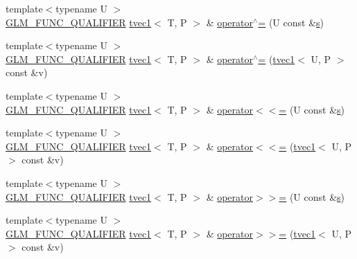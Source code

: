 \begin{DoxyCompactItemize}
\item 
{\footnotesize template$<$typename U $>$ }\\\hyperlink{setup_8hpp_a33fdea6f91c5f834105f7415e2a64407}{G\+L\+M\+\_\+\+F\+U\+N\+C\+\_\+\+Q\+U\+A\+L\+I\+F\+I\+ER} \hyperlink{structglm_1_1detail_1_1tvec1}{tvec1}$<$ T, P $>$ \& \hyperlink{structglm_1_1detail_1_1tvec1_a72ace2280c4b3e1487a469b652c120cd}{operator$^\wedge$=} (U const \&\hyperlink{structglm_1_1detail_1_1tvec1_a1025b03a3e1f99c7a42518af40737d7b}{s})
\item 
{\footnotesize template$<$typename U $>$ }\\\hyperlink{setup_8hpp_a33fdea6f91c5f834105f7415e2a64407}{G\+L\+M\+\_\+\+F\+U\+N\+C\+\_\+\+Q\+U\+A\+L\+I\+F\+I\+ER} \hyperlink{structglm_1_1detail_1_1tvec1}{tvec1}$<$ T, P $>$ \& \hyperlink{structglm_1_1detail_1_1tvec1_ab48008a42136d1116d006c44cf0a6da1}{operator$^\wedge$=} (\hyperlink{structglm_1_1detail_1_1tvec1}{tvec1}$<$ U, P $>$ const \&v)
\item 
{\footnotesize template$<$typename U $>$ }\\\hyperlink{setup_8hpp_a33fdea6f91c5f834105f7415e2a64407}{G\+L\+M\+\_\+\+F\+U\+N\+C\+\_\+\+Q\+U\+A\+L\+I\+F\+I\+ER} \hyperlink{structglm_1_1detail_1_1tvec1}{tvec1}$<$ T, P $>$ \& \hyperlink{structglm_1_1detail_1_1tvec1_a7ff4b3a808e1ef7000ad8d41d7a428bb}{operator$<$$<$=} (U const \&\hyperlink{structglm_1_1detail_1_1tvec1_a1025b03a3e1f99c7a42518af40737d7b}{s})
\item 
{\footnotesize template$<$typename U $>$ }\\\hyperlink{setup_8hpp_a33fdea6f91c5f834105f7415e2a64407}{G\+L\+M\+\_\+\+F\+U\+N\+C\+\_\+\+Q\+U\+A\+L\+I\+F\+I\+ER} \hyperlink{structglm_1_1detail_1_1tvec1}{tvec1}$<$ T, P $>$ \& \hyperlink{structglm_1_1detail_1_1tvec1_a61fb7165bc6cf2c741e7aea9af680e60}{operator$<$$<$=} (\hyperlink{structglm_1_1detail_1_1tvec1}{tvec1}$<$ U, P $>$ const \&v)
\item 
{\footnotesize template$<$typename U $>$ }\\\hyperlink{setup_8hpp_a33fdea6f91c5f834105f7415e2a64407}{G\+L\+M\+\_\+\+F\+U\+N\+C\+\_\+\+Q\+U\+A\+L\+I\+F\+I\+ER} \hyperlink{structglm_1_1detail_1_1tvec1}{tvec1}$<$ T, P $>$ \& \hyperlink{structglm_1_1detail_1_1tvec1_a9f9d23540183bc4baa3b01052f61e0f9}{operator$>$$>$=} (U const \&\hyperlink{structglm_1_1detail_1_1tvec1_a1025b03a3e1f99c7a42518af40737d7b}{s})
\item 
{\footnotesize template$<$typename U $>$ }\\\hyperlink{setup_8hpp_a33fdea6f91c5f834105f7415e2a64407}{G\+L\+M\+\_\+\+F\+U\+N\+C\+\_\+\+Q\+U\+A\+L\+I\+F\+I\+ER} \hyperlink{structglm_1_1detail_1_1tvec1}{tvec1}$<$ T, P $>$ \& \hyperlink{structglm_1_1detail_1_1tvec1_a6867d5e71d657b7d5498979ab8d8f1cf}{operator$>$$>$=} (\hyperlink{structglm_1_1detail_1_1tvec1}{tvec1}$<$ U, P $>$ const \&v)
\end{DoxyCompactItemize}
